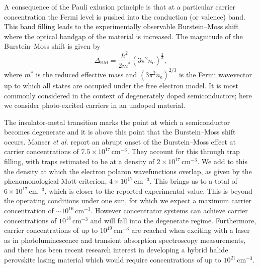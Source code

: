 A consequence of the Pauli exlusion principle is that at a particular carrier concentration the Fermi level is pushed into the conduction (or valence) band. 
This band filling leads to the experimentally observable Burstein--Moss shift where the optical bandgap of the material is increased.
The magnitude of the Burstein--Moss shift is given by 
\begin{equation} \label{parabolic_shift}
\Delta_{\text{BM}} =\frac{\hbar^2}{2m^*}(3\pi^2n_{\text{e}})^{\frac{2}{3}},
\end{equation}
where $m^*$ is the reduced effective mass and $(3\pi^2n_{\text{e}})^{2/3}$ is the Fermi wavevector up to which all states are occupied under the free electron model. 
It is most commonly considered in the context of degenerately doped semiconductors; here we consider photo-excited carriers in an undoped material.

The insulator-metal transition marks the point at which a semiconductor becomes degenerate and it is above this point that the Burstein--Moss shift occurs.
Manser \textit{et al.} report an abrupt onset of the Burstein--Moss effect at carrier concentrations of $7.5\!\times\!10^{17}\,\mathrm{cm}^{-3}$.\autocite{Manser2014}
They account for this through trap filling, with traps estimated to be at a density of $2\!\times\!10^{17}\,\mathrm{cm}^{-3}$.
We add to this the density at which the electron polaron wavefunctions overlap, as given by the phenomonological Mott criterion\autocite{Mott1949}, $4\!\times\!10^{17}\,\mathrm{cm}^{-3}$.\autocite{Frost2017} 
This brings us to a total of $6\!\times\!10^{17}\,\mathrm{cm}^{-3}$, which is closer to the reported experimental value. 
This is beyond the operating conditions under one sun, for which we expect a maximum carrier concentration of $\sim10^{16}\,\mathrm{cm}^{-3}$.\autocite{Herz2016} 
However concentrator systems can achieve carrier concentrations of $10^{18}\,\mathrm{cm}^{-3}$ \autocite{Law2014} and will fall into the degenerate regime.
Furthermore, carrier concentrations of up to $10^{19}\,\mathrm{cm}^{-3}$ are reached when exciting with a laser as in photoluminescence and transient absorption spectroscopy measurements,\autocite{Richter2016}
and there has been recent research interest in developing a hybrid halide perovskite lasing material which would require concentrations of up to $10^{21}\,\mathrm{cm}^{-3}$.\autocite{Gao2017}

